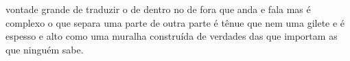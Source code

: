 \begin{poem}
\begin{stanza}
vontade grande de traduzir\verseline
o de dentro no de fora\verseline
que anda e fala\verseline
\qquad mas é complexo o que separa\verseline
\qquad uma parte de outra parte\verseline
é tênue\verseline
que nem\verseline
uma gilete\verseline
e é espesso e alto como uma muralha\verseline
construída de verdades\verseline
\qquad das que importam\verseline
\qquad as que ninguém sabe.
\end{stanza}
\end{poem}